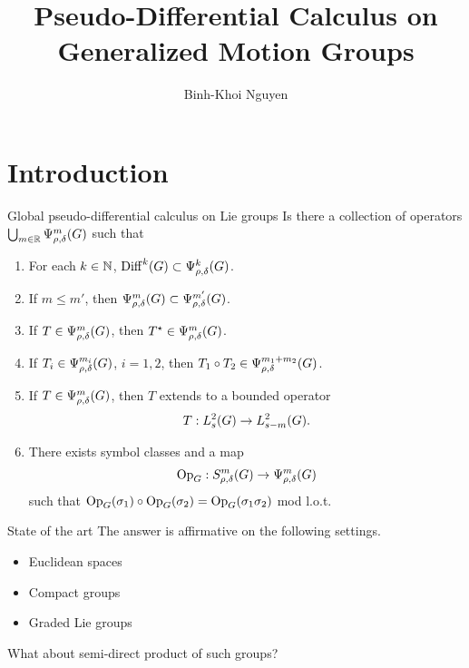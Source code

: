 \documentclass{beamer}
\title{Pseudo-Differential Calculus on Generalized Motion Groups}
\author{Binh-Khoi Nguyen}
\begin{document}
\maketitle

\section{Introduction}

\begin{frame}{Global pseudo-differential calculus on Lie groups}
    Is there a collection of operators $\bigcup_{m \in \mathbb{R}} \Psi^{m}_{\rho, \delta}(G)$ such that
    \begin{enumerate}
        \item
            For each $k \in \mathbb{N}$,
            $\mathrm{Diff}^k(G) \subset \Psi^{k}_{\rho, \delta}(G)$.
            \pause
        \item
            If $m \leq m'$,
            then $\Psi^{m}_{\rho, \delta}(G) \subset \Psi^{m'}_{\rho, \delta}(G)$.
            \pause
        \item
            If $T \in \Psi^{m}_{\rho, \delta}(G)$, then ${T}^\star \in \Psi^{m}_{\rho, \delta}(G)$.
            \pause
        \item
            If $T_i \in \Psi^{m_i}_{\rho, \delta}(G)$, $i = 1, 2$,
            then $T_1 \circ T_2 \in \Psi^{m_1 + m_2}_{\rho, \delta}(G)$.
            \pause
        \item
            If $T \in \Psi^{m}_{\rho, \delta}(G)$,
            then $T$ extends to a bounded operator
            \begin{align*}
                T : L^2_{s}(G) \to L^2_{s - m}(G).
            \end{align*}
            \pause
        \item There exists symbol classes and a map
            \begin{align*}
                \mathrm{Op}_{G} : S^{m}_{\rho, \delta}(G) \to \Psi^{m}_{\rho, \delta}(G)
            \end{align*}
            such that
            $\mathrm{Op}_{G} (\sigma_1) \circ \mathrm{Op}_{G}(\sigma_2) = \mathrm{Op}_{G} (\sigma_1 \sigma_2)$
            mod l.o.t.
    \end{enumerate}
\end{frame}

\begin{frame}{State of the art}
    The answer is affirmative on the following settings.

    \begin{itemize}
        \item Euclidean spaces
            \pause
        \item Compact groups \cite{RuzhanskyTurunen10}
            \pause
        \item Graded Lie groups \cite{FischerRuzhansky16}
            \pause
    \end{itemize}

    What about semi-direct product of such groups?
\end{frame}
\end{document}
